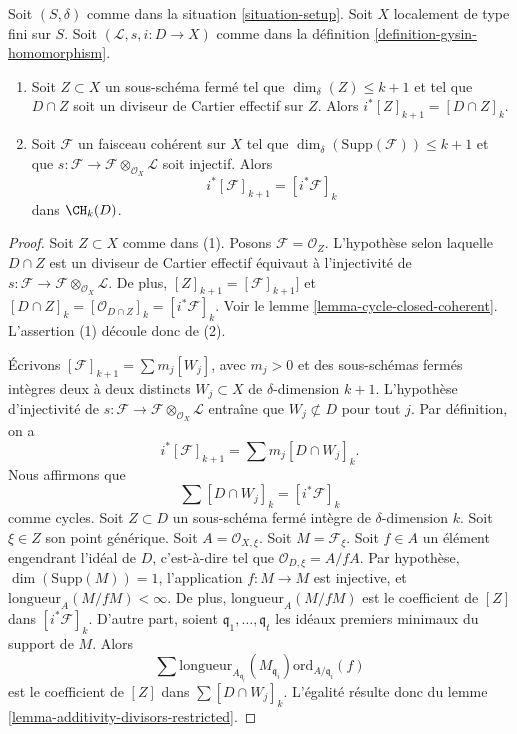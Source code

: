 \begin{lemma}
\label{lemma-easy-gysin}
Soit $(S, \delta)$ comme dans la situation \ref{situation-setup}.
Soit $X$ localement de type fini sur $S$.
Soit $(\mathcal{L}, s, i : D \to X)$ comme dans la
définition \ref{definition-gysin-homomorphism}.
\begin{enumerate}
\item Soit $Z \subset X$ un sous-schéma fermé tel
que $\dim_\delta(Z) \leq k + 1$ et tel que
$D \cap Z$ soit un diviseur de Cartier effectif sur $Z$. Alors
$i^*[Z]_{k + 1} = [D \cap Z]_k$.
\item Soit $\mathcal{F}$ un faisceau cohérent sur $X$
tel que $\dim_\delta(\text{Supp}(\mathcal{F})) \leq k + 1$ et que
$s : \mathcal{F} \to \mathcal{F} \otimes_{\mathcal{O}_X} \mathcal{L}$
soit injectif. Alors
$$
i^*[\mathcal{F}]_{k + 1} = [i^*\mathcal{F}]_k
$$
dans $\CH_k(D)$.
\end{enumerate}
\end{lemma}

\begin{proof}
Soit $Z \subset X$ comme dans (1). Posons $\mathcal{F} = \mathcal{O}_Z$.
L'hypothèse selon laquelle $D \cap Z$ est un diviseur de Cartier effectif
équivaut à l'injectivité de
$s : \mathcal{F} \to \mathcal{F} \otimes_{\mathcal{O}_X} \mathcal{L}$.
De plus, $[Z]_{k + 1} = [\mathcal{F}]_{k + 1}]$
et $[D \cap Z]_k = [\mathcal{O}_{D \cap Z}]_k = [i^*\mathcal{F}]_k$.
Voir le lemme \ref{lemma-cycle-closed-coherent}.
L'assertion (1) découle donc de (2).

\medskip\noindent
Écrivons $[\mathcal{F}]_{k + 1} = \sum m_j[W_j]$, avec $m_j > 0$
et des sous-schémas fermés intègres deux à deux distincts $W_j \subset X$
de $\delta$-dimension $k + 1$. L'hypothèse d'injectivité de
$s : \mathcal{F} \to \mathcal{F} \otimes_{\mathcal{O}_X} \mathcal{L}$
entraîne que $W_j \not \subset D$ pour tout $j$.
Par définition, on a
$$
i^*[\mathcal{F}]_{k + 1} = \sum m_j [D \cap W_j]_k.
$$
Nous affirmons que
$$
\sum [D \cap W_j]_k = [i^*\mathcal{F}]_k
$$
comme cycles.
Soit $Z \subset D$ un sous-schéma fermé intègre de $\delta$-dimension
$k$. Soit $\xi \in Z$ son point générique. Soit $A = \mathcal{O}_{X, \xi}$.
Soit $M = \mathcal{F}_\xi$. Soit $f \in A$ un élément engendrant
l'idéal de $D$, c'est-à-dire tel que $\mathcal{O}_{D, \xi} = A/fA$.
Par hypothèse, $\dim(\text{Supp}(M)) = 1$,
l'application $f : M \to M$ est injective, et
$\text{longueur}_A(M/fM) < \infty$. De plus, $\text{longueur}_A(M/fM)$
est le coefficient de $[Z]$ dans $[i^*\mathcal{F}]_k$. D'autre
part, soient $\mathfrak q_1, \ldots, \mathfrak q_t$ les idéaux premiers minimaux
du support de $M$. Alors
$$
\sum
\text{longueur}_{A_{\mathfrak q_i}}(M_{\mathfrak q_i})
\text{ord}_{A/\mathfrak q_i}(f)
$$
est le coefficient de $[Z]$ dans $\sum [D \cap W_j]_k$.
L'égalité résulte donc du
lemme \ref{lemma-additivity-divisors-restricted}.
\end{proof}

